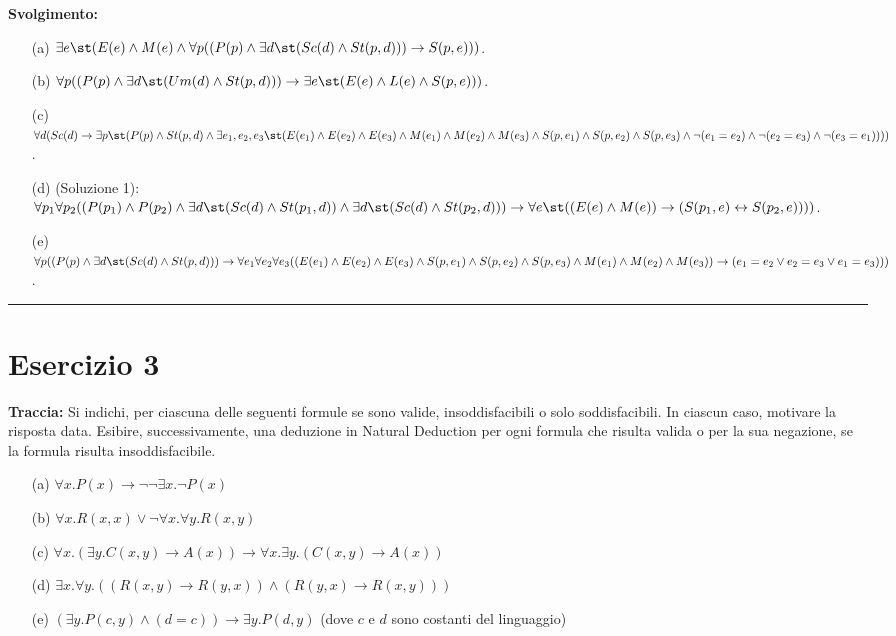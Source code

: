 \textbf{Svolgimento:}
\begin{enumerate}
    \item[(a)] \(\exists e\st (E(e) \wedge M(e) \wedge \forall p((P(p) \wedge \exists d\st (Sc(d) \wedge St(p,d))) \rightarrow S(p,e)))\).
    \item[(b)] \(\forall p((P(p) \wedge \exists d\st (Um(d) \wedge St(p,d))) \rightarrow \exists e\st (E(e) \wedge L(e) \wedge S(p,e)))\).
    \item[(c)] \(\forall d(Sc(d) \rightarrow \exists p\st (P(p) \wedge St(p,d) \wedge \exists e_1, e_2, e_3\st (E(e_1) \wedge E(e_2) \wedge E(e_3) \wedge M(e_1) \wedge M(e_2) \wedge M(e_3) \wedge S(p,e_1) \wedge S(p,e_2) \wedge S(p,e_3) \wedge \neg(e_1=e_2) \wedge \neg(e_2=e_3) \wedge \neg(e_3=e_1))))\).
    \item[(d)] (Soluzione 1): \(\forall p_1 \forall p_2 ((P(p_1) \wedge P(p_2) \wedge \exists d\st (Sc(d) \wedge St(p_1,d)) \wedge \exists d\st (Sc(d) \wedge St(p_2,d))) \rightarrow \forall e\st ((E(e) \wedge M(e)) \rightarrow (S(p_1,e) \leftrightarrow S(p_2,e))))\).
    \item[(e)] \(\forall p((P(p) \wedge \exists d\st (Sc(d) \wedge St(p,d))) \rightarrow \forall e_1 \forall e_2 \forall e_3 ((E(e_1) \wedge E(e_2) \wedge E(e_3) \wedge S(p,e_1) \wedge S(p,e_2) \wedge S(p,e_3) \wedge M(e_1) \wedge M(e_2) \wedge M(e_3)) \rightarrow (e_1=e_2 \vee e_2=e_3 \vee e_1=e_3)))\).
\end{enumerate}

\vspace{1em}
\hrule
\vspace{1em}

\section*{Esercizio 3}

\textbf{Traccia:}
Si indichi, per ciascuna delle seguenti formule se sono valide, insoddisfacibili o solo soddisfacibili. In ciascun caso, motivare la risposta data. Esibire, successivamente, una deduzione in Natural Deduction per ogni formula che risulta valida o per la sua negazione, se la formula risulta insoddisfacibile.
\begin{enumerate}
    \item[(a)] \(\forall x.P(x)\rightarrow\neg\neg\exists x.\neg P(x)\)
    \item[(b)] \(\forall x.R(x,x)\vee\neg\forall x.\forall y.R(x,y)\)
    \item[(c)] \(\forall x.(\exists y.C(x,y)\rightarrow A(x))\rightarrow\forall x.\exists y.(C(x,y)\rightarrow A(x))\)
    \item[(d)] \(\exists x.\forall y.((R(x,y)\rightarrow R(y,x))\wedge(R(y,x)\rightarrow R(x,y)))\)
    \item[(e)] \((\exists y.P(c,y)\wedge(d=c))\rightarrow\exists y.P(d,y)\) (dove \(c\) e \(d\) sono costanti del linguaggio)
\end{enumerate}

